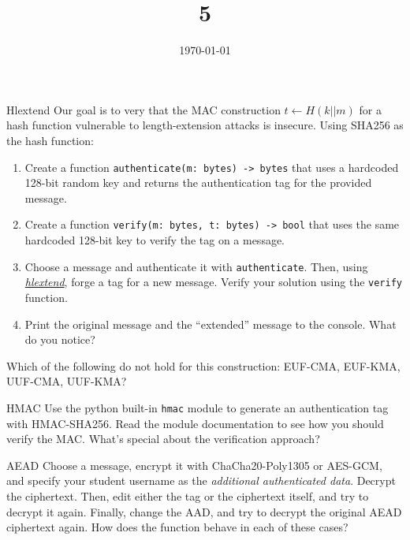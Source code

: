 \documentclass{practice}
\title{5}
\date{\today}
\begin{document}
\maketitle

\begin{task}{Hlextend}
  Our goal is to very that the MAC construction $t \gets H(k||m)$ for a hash function vulnerable to length-extension attacks is insecure.
  Using SHA256 as the hash function:
  \begin{enumerate}
    \item Create a function \texttt{authenticate(m: bytes) -> bytes} that uses a hardcoded 128-bit random key and returns the authentication tag for the provided message.
    \item Create a function \texttt{verify(m: bytes, t: bytes) -> bool} that uses the same hardcoded 128-bit key to verify the tag on a message.
    \item Choose a message and authenticate it with \texttt{authenticate}.
    Then, using \href{https://github.com/stephenbradshaw/hlextend}{\emph{hlextend}}, forge a tag for a new message.
    Verify your solution using the \texttt{verify} function.
    \item Print the original message and the \enquote{extended} message to the console.
    What do you notice?
  \end{enumerate}

  Which of the following do not hold for this construction: EUF-CMA, EUF-KMA, UUF-CMA, UUF-KMA?
\end{task}

\begin{task}{HMAC}
  Use the python built-in \texttt{hmac} module to generate an authentication tag with HMAC-SHA256.
  Read the module documentation to see how you should verify the MAC.
  What's special about the verification approach?
\end{task}

\begin{task}{AEAD}
  Choose a message, encrypt it with ChaCha20-Poly1305 or AES-GCM, and specify your student username as the \emph{additional authenticated data}.
  Decrypt the ciphertext.
  Then, edit either the tag or the ciphertext itself, and try to decrypt it again.
  Finally, change the AAD, and try to decrypt the original AEAD ciphertext again.
  How does the function behave in each of these cases?
\end{task}
\end{document}
